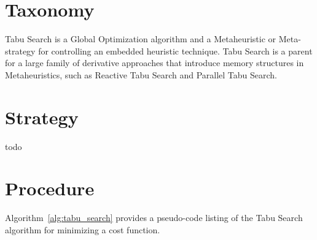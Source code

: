 \documentclass[a4paper, 11pt]{article}
\begin{document}
\section{Taxonomy}
\label{sec:taxonomy}
Tabu Search is a Global Optimization algorithm and a Metaheuristic or Meta-strategy for controlling an embedded heuristic technique. 
Tabu Search is a parent for a large family of derivative approaches that introduce memory structures in Metaheuristics, such as Reactive Tabu Search and Parallel Tabu Search.

\section{Strategy}
\label{sec:strategy}
todo

\section{Procedure}
\label{sec:procedure}
Algorithm~\ref{alg:tabu_search} provides a pseudo-code listing of the Tabu Search algorithm for minimizing a cost function.
\end{document}
